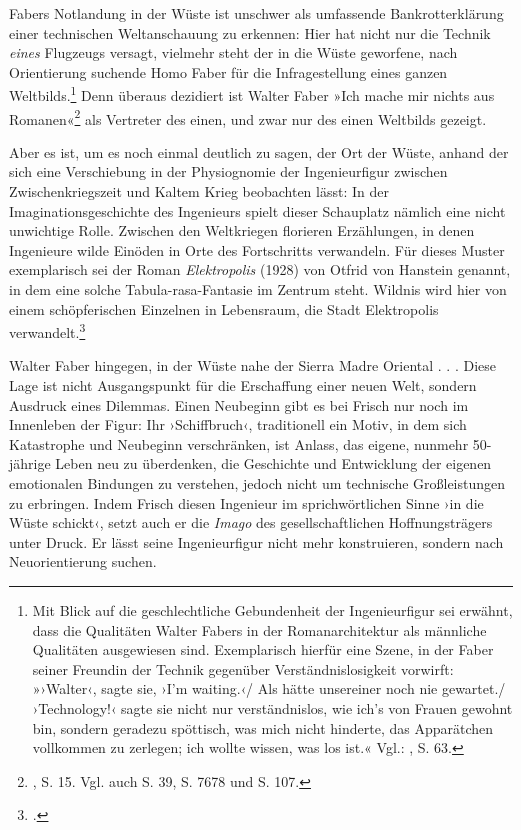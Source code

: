 \documentclass[%
	fontsize=10pt,%
	twoside,%
	headings=optiontoheadandtoc,%
	showtrims]{scrbook}
\begin{document}
\par Fabers Notlandung in der Wüste ist unschwer als umfassende Bankrotterklärung einer technischen Weltanschauung zu erkennen: Hier hat nicht nur die Technik \emph{eines} Flugzeugs versagt, vielmehr steht der in die Wüste geworfene, nach Orientierung suchende Homo Faber für die Infragestellung eines ganzen Weltbilds.\footnote{Mit Blick auf die geschlechtliche Gebundenheit der Ingenieurfigur sei erwähnt, dass die Qualitäten Walter Fabers in der Romanarchitektur als männliche Qualitäten ausgewiesen sind. Exemplarisch hierfür eine Szene, in der Faber seiner Freundin der Technik gegenüber Verständnislosigkeit vorwirft: »›Walter‹, sagte sie, ›I\textquoteright{}m waiting.‹/ Als hätte unsereiner noch nie gewartet./ ›Technology!‹ sagte sie \textendash{} nicht nur verständnislos, wie ich\textquoteright{}s von Frauen gewohnt bin, sondern geradezu spöttisch, was mich nicht hinderte, das Apparätchen vollkommen zu zerlegen; ich wollte wissen, was los ist.« Vgl.: \cite[][]{frisch1977a}, S. 63.}  Denn überaus dezidiert ist Walter Faber \textendash{} »Ich mache mir nichts aus Romanen«\footnote{\cite[][]{frisch1977a}, S. 15. Vgl. auch S. 39, S. 76\textendash{}78 und S. 107.}  \textendash{} als Vertreter des einen, und zwar nur des einen Weltbilds gezeigt.\par Aber es ist, um es noch einmal deutlich zu sagen, der Ort der Wüste, anhand der sich eine Verschiebung in der Physiognomie der Ingenieurfigur zwischen Zwischenkriegszeit und Kaltem Krieg beobachten lässt: In der Imaginationsgeschichte des Ingenieurs spielt dieser Schauplatz nämlich eine nicht unwichtige Rolle. Zwischen den Weltkriegen florieren Erzählungen, in denen Ingenieure wilde Einöden in Orte des Fortschritts verwandeln. Für dieses Muster exemplarisch sei der Roman \emph{Elektropolis} (1928) von Otfrid von Hanstein genannt, in dem eine solche Tabula-rasa-Fantasie im Zentrum steht. Wildnis wird hier von einem schöpferischen Einzelnen in Lebensraum, die Stadt Elektropolis verwandelt.\footnote{\cite[][]{hanstein1928a}.} \par Walter Faber hingegen, in der Wüste nahe der Sierra Madre Oriental . . . Diese Lage ist nicht Ausgangspunkt für die Erschaffung einer neuen Welt, sondern Ausdruck eines Dilemmas. Einen Neubeginn gibt es bei Frisch nur noch im Innenleben der Figur: Ihr ›Schiffbruch‹, traditionell ein Motiv, in dem sich Katastrophe und Neubeginn verschränken, ist Anlass, das eigene, nunmehr 50-jährige Leben neu zu überdenken, die Geschichte und Entwicklung der eigenen emotionalen Bindungen zu verstehen, jedoch nicht um technische Großleistungen zu erbringen. Indem Frisch diesen Ingenieur im sprichwörtlichen Sinne ›in die Wüste schickt‹, setzt auch er die \emph{Imago} des gesellschaftlichen Hoffnungsträgers unter Druck. Er lässt seine Ingenieurfigur nicht mehr konstruieren, sondern nach Neuorientierung suchen.
\end{document}
